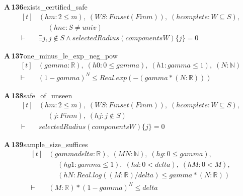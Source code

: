 \documentclass[conference]{IEEEtran}
\theoremstyle{definition}
\newcommand{\lean}[1]{\textsf{\footnotesize #1}}
\begin{document}
\noindent\textbf{A\,136}\quad\lean{exists\_certified\_safe}
{\footnotesize\[ \begin{aligned}[t]
&(\mathit{hm} : 2 \leq \mathit{m}),\; (\mathit{W} \mathit{S} : \mathit{Finset} (\mathit{Fin} \mathit{m})),\; (\mathit{hcomplete} : \mathit{W} \subseteq \mathit{S}),\\
&\quad \; (\mathit{hne} : \mathit{S} \neq \mathit{univ})\\
\vdash\;&\exists \mathit{j}, \mathit{j} \notin \mathit{S} \wedge \mathit{selectedRadius} (\mathit{components} \mathit{W}) \{ \mathit{j}\} = 0
\end{aligned} \]}

\noindent\textbf{A\,137}\quad\lean{one\_minus\_le\_exp\_neg\_pow}
{\footnotesize\[ \begin{aligned}[t]
&(\mathit{gamma} : \mathbb{R} ),\; (\mathit{h0} : 0 \leq \mathit{gamma}),\; (\mathit{h1} : \mathit{gamma} \leq 1),\; (\mathit{N} : \mathbb{N} )\\
\vdash\;&(1-\mathit{gamma})^{\mathit{N}} \leq \mathit{Real}.\mathit{exp} (-(\mathit{gamma}*(\mathit{N}:\mathbb{R} )))
\end{aligned} \]}

\noindent\textbf{A\,138}\quad\lean{safe\_of\_unseen}
{\footnotesize\[ \begin{aligned}[t]
&(\mathit{hm} : 2 \leq \mathit{m}),\; (\mathit{W} \mathit{S} : \mathit{Finset} (\mathit{Fin} \mathit{m})),\; (\mathit{hcomplete} : \mathit{W} \subseteq \mathit{S}),\\
&\quad \; (\mathit{j} : \mathit{Fin} \mathit{m}),\; (\mathit{hj} : \mathit{j} \notin \mathit{S})\\
\vdash\;&\mathit{selectedRadius} (\mathit{components} \mathit{W}) \{ \mathit{j}\} = 0
\end{aligned} \]}

\noindent\textbf{A\,139}\quad\lean{sample\_size\_suffices}
{\footnotesize\[ \begin{aligned}[t]
&(\mathit{gamma} \mathit{delta} : \mathbb{R} ),\; (\mathit{M} \mathit{N} : \mathbb{N} ),\; (\mathit{hg} : 0 \leq \mathit{gamma}),\\
&\quad \; (\mathit{hg1} : \mathit{gamma} \leq 1),\; (\mathit{hd} : 0 < \mathit{delta}),\; (\mathit{hM} : 0 < \mathit{M}),\\
&\quad \; (\mathit{hN} : \mathit{Real}.\mathit{log} ((\mathit{M}:\mathbb{R} )/\mathit{delta}) \leq \mathit{gamma}*(\mathit{N}:\mathbb{R} ))\\
\vdash\;&(\mathit{M}:\mathbb{R} )*(1-\mathit{gamma})^{\mathit{N}} \leq \mathit{delta}
\end{aligned} \]}
\end{document}
